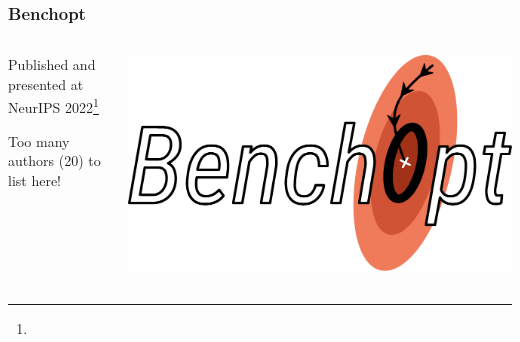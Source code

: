 \documentclass[10pt]{beamer}
\begin{document}
\begin{frame}[c]
  \frametitle{Benchopt}

  \begin{columns}
    \begin{column}{0.45\textwidth}
      Published and presented at NeurIPS 2022\footnote[frame]{}

      \medskip

      Too many authors (20) to list here!
    \end{column}
    \begin{column}{0.45\textwidth}
      \includegraphics[width=\textwidth]{figures/paper4-benchopt_logo.pdf}
    \end{column}
  \end{columns}
\end{frame}
\end{document}
